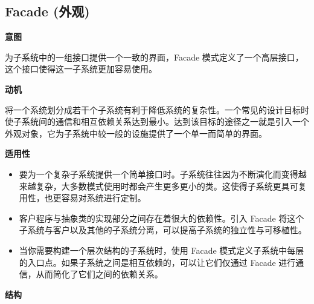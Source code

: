 \subsection{Facade (外观)}

\noindent\textbf{意图}

为子系统中的一组接口提供一个一致的界面，Facade 模式定义了一个高层接口，这个接口使得这一子系统更加容易使用。

\noindent\textbf{动机}

将一个系统划分成若干个子系统有利于降低系统的复杂性。一个常见的设计目标时使子系统间的通信和相互依赖关系达到最小。达到该目标的途径之一就是引入一个外观对象，它为子系统中较一般的设施提供了一个单一而简单的界面。

\noindent\textbf{适用性}

\begin{itemize}
    \item 要为一个复杂子系统提供一个简单接口时。子系统往往因为不断演化而变得越来越复杂，大多数模式使用时都会产生更多更小的类。这使得子系统更具可复用性，也更容易对系统进行定制。
    \item 客户程序与抽象类的实现部分之间存在着很大的依赖性。引入 Facade 将这个子系统与客户以及其他的子系统分离，可以提高子系统的独立性与可移植性。
    \item 当你需要构建一个层次结构的子系统时，使用 Facade 模式定义子系统中每层的入口点。如果子系统之间是相互依赖的，可以让它们仅通过 Facade 进行通信，从而简化了它们之间的依赖关系。
\end{itemize}

\noindent\textbf{结构}

\begin{figure}[H]
    \scriptsize
    \centering
\end{figure}


